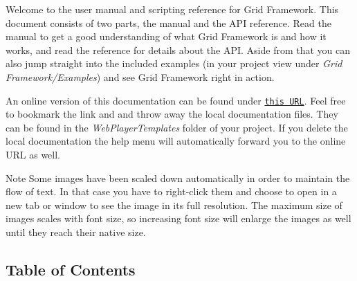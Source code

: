 Welcome to the user manual and scripting reference for Grid Framework. This document consists of two parts, the manual and the A\+P\+I reference. Read the manual to get a good understanding of what Grid Framework is and how it works, and read the reference for details about the A\+P\+I. Aside from that you can also jump straight into the included examples (in your project view under {\itshape Grid Framework/\+Examples}) and see Grid Framework right in action.

An online version of this documentation can be found under \href{http://hiphish.github.io/grid-framework/documentation/}{\tt this U\+R\+L}. Feel free to bookmark the link and and throw away the local documentation files. They can be found in the {\itshape Web\+Player\+Templates} folder of your project. If you delete the local documentation the help menu will automatically forward you to the online U\+R\+L as well.

\begin{DoxyNote}{Note}
Some images have been scaled down automatically in order to maintain the flow of text. In that case you have to right-\/click them and choose to open in a new tab or window to see the image in its full resolution. The maximum size of images scales with font size, so increasing font size will enlarge the images as well until they reach their native size.
\end{DoxyNote}
\subsection*{Table of Contents }

